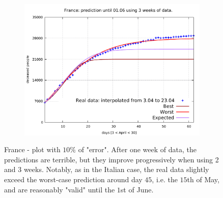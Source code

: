 \documentclass[8pt]{article}
\begin{document}
\begin{figure}[h!]
\begin{subfigure}[b]{0.45\linewidth}
  \includegraphics[width=\linewidth]{../err10p_simulations/fr/3-23/3-23.pdf}
  \end{subfigure}
	\caption{France - plot with $10\%$ of "error". After one week of
	data, the predictions are terrible, but they improve progressively when
	using 2 and 3 weeks. Notably, as in the Italian case, the real
	data slightly exceed the worst-case prediction around day $45$,
	i.e. the $15$th of May, and are reasonably "valid" until
	the $1$st of June.}
\end{figure}
\end{document}
